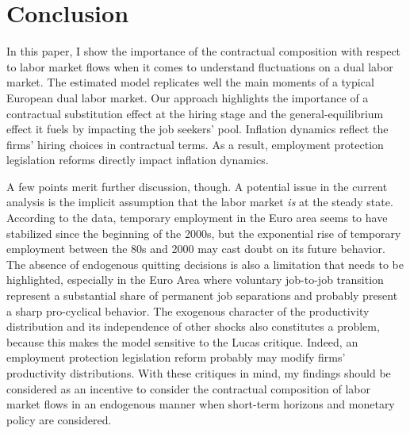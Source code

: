 \section{Conclusion}

In this paper, I show the importance of the contractual composition with respect to labor market flows when it comes to understand fluctuations on a dual labor market. The estimated model replicates well the main moments of a typical European dual labor market. Our approach highlights the importance of a contractual substitution effect at the hiring stage and the general-equilibrium effect it fuels by impacting the job seekers' pool. Inflation dynamics reflect the firms' hiring choices in contractual terms. As a result, employment protection legislation reforms directly impact inflation dynamics.

A few points merit further discussion, though. A potential issue in the current analysis is the implicit assumption that the labor market \emph{is} at the steady state. According to the data, temporary employment in the Euro area seems to have stabilized since the beginning of the 2000s, but the exponential rise of temporary employment between the 80s and 2000 may cast doubt on its future behavior. The absence of endogenous quitting decisions is also a limitation that needs to be highlighted, especially in the Euro Area where voluntary job-to-job transition represent a substantial share of permanent job separations and probably present a sharp pro-cyclical behavior. The exogenous character of the productivity distribution and its independence of other shocks also constitutes a problem, because this makes the model sensitive to the Lucas critique. Indeed, an employment protection legislation reform probably may modify firms' productivity distributions. With these critiques in mind, my findings should be considered as an incentive to consider the contractual composition of labor market flows in an endogenous manner when short-term horizons and monetary policy are considered.

